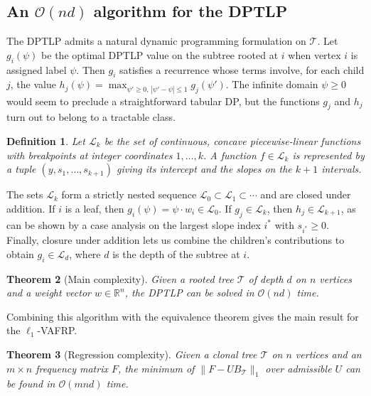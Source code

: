 \documentclass[11pt]{article}
\newtheorem{theorem}{Theorem}
\newtheorem{definition}[theorem]{Definition}
\begin{document}
\subsection{An $\mathcal{O}(nd)$ algorithm for the DPTLP}

The DPTLP admits a natural dynamic programming formulation on $\mathcal{T}$. Let $g_i(\psi)$ be the optimal DPTLP value on the subtree rooted at $i$ when vertex $i$ is assigned label $\psi$. Then $g_i$ satisfies a recurrence whose terms involve, for each child $j$, the value $h_j(\psi) = \max_{\psi'\geq 0,\,|\psi' - \psi|\leq 1} g_j(\psi')$. The infinite domain $\psi \geq 0$ would seem to preclude a straightforward tabular DP, but the functions $g_j$ and $h_j$ turn out to belong to a tractable class.

\begin{definition}
Let $\mathcal{L}_k$ be the set of continuous, concave piecewise-linear functions with breakpoints at integer coordinates $1,\ldots,k$. A function $f\in\mathcal{L}_k$ is represented by a tuple $(y, s_1,\ldots,s_{k+1})$ giving its intercept and the slopes on the $k+1$ intervals.
\end{definition}

The sets $\mathcal{L}_k$ form a strictly nested sequence $\mathcal{L}_0\subset\mathcal{L}_1\subset\cdots$ and are closed under addition. If $i$ is a leaf, then $g_i(\psi) = \psi \cdot w_i\in\mathcal{L}_0$. If $g_j\in\mathcal{L}_k$, then $h_j\in\mathcal{L}_{k+1}$, as can be shown by a case analysis on the largest slope index $i^*$ with $s_{i^*}\geq 0$. Finally, closure under addition lets us combine the children's contributions to obtain $g_i\in\mathcal{L}_d$, where $d$ is the depth of the subtree at $i$.

\begin{theorem}[Main complexity]
Given a rooted tree $\mathcal{T}$ of depth $d$ on $n$ vertices and a weight vector $w\in\mathbb{R}^n$, the DPTLP can be solved in $\mathcal{O}(nd)$ time.
\end{theorem}

Combining this algorithm with the equivalence theorem gives the main result for the $\ell_1$-VAFRP.

\begin{theorem}[Regression complexity]
Given a clonal tree $\mathcal{T}$ on $n$ vertices and an $m \times n$ frequency matrix $F$, the minimum of $\|F - UB_{\mathcal{T}}\|_1$ over admissible $U$ can be found in $\mathcal{O}(mnd)$ time.
\end{theorem}
\end{document}

